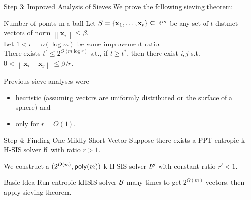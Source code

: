\documentclass[xcolor=table,10pt,aspectratio=169]{beamer}
\renewcommand{\vec}[1]{\ensuremath{\mathbf{#1}}\xspace}
\newcommand{\norm}[1]{\left\lVert#1\right\rVert}
\begin{document}
\begin{frame}[label={sec:orgb713a6a}]{Step 3: Improved Analysis of Sieves}
We prove the following sieving theorem:

\begin{alertblock}{Number of points in a ball}
Let \(S = \set{\vec{x}_1, \ldots, \vec{x}_t} \subseteq \RR^m\) be any set of \(t\) distinct vectors of norm \(\norm{\vec{x}_i} \leq \beta\).\\[0pt]
Let \(1 < r = o(\log m)\) be some improvement ratio.\\[0pt]
There exists \(t^* \leq 2^{O(m \log r)}\) s.t., if \(t \geq t^*\), then there exist \(i,j\) s.t. \(0 < \norm{\vec{x}_i - \vec{x}_j} \leq \beta/r\).
\end{alertblock}

Previous sieve analyses were
\begin{itemize}
\item heuristic (assuming vectors are uniformly distributed on the surface of a sphere) and
\item only for \(r = O(1)\).
\end{itemize}
\end{frame}

\begin{frame}[label={sec:org842d4a9}]{Step 4: Finding One Mildly Short Vector}
Suppose there exists a PPT entropic k-H-SIS solver \(\mathcal{B}\) with ratio \(r > 1\).

We construct a \((2^{O(m)},\poly[m])\) k-H-SIS solver \(\mathcal{B}'\) with constant ratio \(r' < 1\).

\begin{alertblock}{Basic Idea}
Run entropic kHSIS solver \(\mathcal{B}\) many times to get \(2^{\Omega(m)}\) vectors, then apply sieving theorem.
\end{alertblock}
\end{frame}
\end{document}
